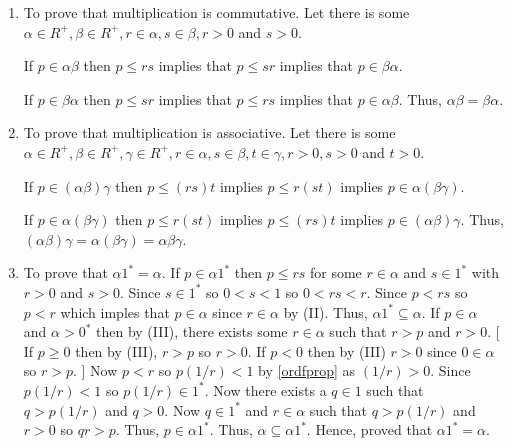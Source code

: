 \begin{enumerate}[{\bf Step 1.}]
\begin{enumerate}[(M1)]
	\item To prove that multiplication is commutative.
	\bigbreak
	Let there is some $\alpha \in R^+, \beta \in R^+, r \in \alpha, s \in \beta, r > 0$ and $s > 0$.

	If $p \in \alpha \beta$ then $p \leq rs$ implies that $p \leq sr$ implies that $p \in \beta \alpha$.

	If $p \in \beta \alpha$ then $p \leq sr$ implies that $p \leq rs$ implies that $p \in \alpha \beta$.
	\bigbreak
	Thus, $\alpha \beta = \beta \alpha$.

	\item To prove that multiplication is associative.
	\bigbreak
	Let there is some $\alpha \in R^+, \beta \in R^+, \gamma \in R^+, r \in \alpha, s \in \beta, t \in \gamma, r > 0, s > 0$ and $t > 0$.

	If $p \in (\alpha \beta) \gamma$ then $p \leq (rs)t$ implies $p \leq r(st)$ implies $p \in \alpha (\beta \gamma)$.

	If $p \in \alpha (\beta \gamma)$ then $p \leq r(st)$ implies $p \leq (rs)t$ implies $p \in (\alpha \beta) \gamma$.
	\bigbreak
	Thus, $(\alpha \beta) \gamma = \alpha (\beta \gamma) = \alpha \beta \gamma$.

	\item To prove that $\alpha 1^* = \alpha$.
	\bigbreak \quad
	If $p \in \alpha 1^*$ then $p \leq rs$ for some $r \in \alpha$ and $s \in 1^*$ with $r > 0$ and $s > 0$.
	Since $s \in 1^*$ so $0 < s < 1$ so $0 < rs < r$.
	Since $p < rs$ so $p < r$ which imples that $p \in \alpha$ since $r \in \alpha$ by (II).
	Thus, $\alpha 1^* \subseteq \alpha$.
	\bigbreak \quad
	If $p \in \alpha$ and $\alpha > 0^*$ then by (III), there exists some $r \in \alpha$ such that $r > p$ and $r > 0$.
	[ If $p \geq 0$ then by (III), $r > p$ so $r > 0$.
	If $p < 0$ then by (III) $r > 0$ since $0 \in \alpha$ so $r > p$. ]
	\bigbreak \quad
	Now $p < r$ so $p (1/r) < 1$ by \ref{ordfprop} as $(1/r) > 0$.
	Since $p(1/r) < 1$ so $p(1/r) \in 1^*$.
	Now there exists a $q \in 1$ such that $q > p(1/r)$ and $q > 0$.
	Now $q \in 1^*$ and $r \in \alpha$ such that $q > p(1/r)$ and $r > 0$
	so $qr > p$. Thus, $p \in \alpha 1^*$.
	Thus, $\alpha \subseteq \alpha 1^*$.
	\bigbreak
	Hence, proved that $\alpha 1^* = \alpha$.


\end{enumerate}
\end{enumerate}
